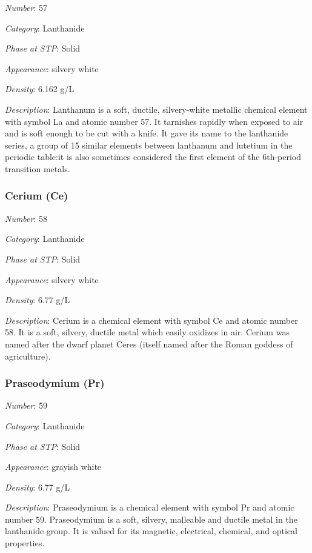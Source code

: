 \documentclass{article}
\begin{document}
\textit{Number}: 57

\textit{Category}: Lanthanide

\textit{Phase at STP}: Solid

\textit{Appearance}: silvery white

\textit{Density}: 6.162 g/L

\textit{Description}: Lanthanum is a soft, ductile, silvery-white metallic chemical element with symbol La and atomic number 57. It tarnishes rapidly when exposed to air and is soft enough to be cut with a knife. It gave its name to the lanthanide series, a group of 15 similar elements between lanthanum and lutetium in the periodic table:it is also sometimes considered the first element of the 6th-period transition metals.

\hypertarget{subsubsection::Ce}{}\subsubsection{Cerium (Ce)}

\textit{Number}: 58

\textit{Category}: Lanthanide

\textit{Phase at STP}: Solid

\textit{Appearance}: silvery white

\textit{Density}: 6.77 g/L

\textit{Description}: Cerium is a chemical element with symbol Ce and atomic number 58. It is a soft, silvery, ductile metal which easily oxidizes in air. Cerium was named after the dwarf planet Ceres (itself named after the Roman goddess of agriculture).

\hypertarget{subsubsection::Pr}{}\subsubsection{Praseodymium (Pr)}

\textit{Number}: 59

\textit{Category}: Lanthanide

\textit{Phase at STP}: Solid

\textit{Appearance}: grayish white

\textit{Density}: 6.77 g/L

\textit{Description}: Praseodymium is a chemical element with symbol Pr and atomic number 59. Praseodymium is a soft, silvery, malleable and ductile metal in the lanthanide group. It is valued for its magnetic, electrical, chemical, and optical properties.
\end{document}
